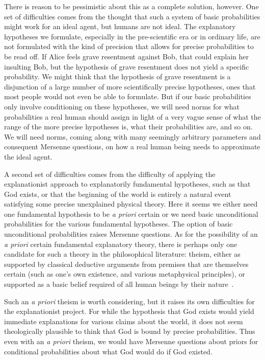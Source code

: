 There is reason to be pessimistic about this as a complete solution, however. One set of difficulties comes
from the thought that such a system of basic probabilities might work for an ideal agent, but humans are not
ideal. The explanatory hypotheses we formulate, especially in the pre-scientific era or in ordinary life, are not formulated
with the kind of precision that allows for precise probabilities to be read off. If Alice feels grave resentment against
Bob, that could explain her insulting Bob, but the hypothesis of grave resentment does not yield a specific 
probability. We might think that the hypothesis of grave resentment is a disjunction of a large
number of more scientifically precise hypotheses, ones that most people would not even be able to formulate. 
But if our basic probabilities only involve conditioning on these hypotheses, we will need norms for what probabilities 
a real human should assign in light of a very vague sense of what the range of the more precise hypotheses is,
what their probabilities are, and so on. We will need norms, coming along with many seemingly arbitrary parameters
and consequent Mersenne questions, on how a real human being needs to approximate the ideal agent.

A second set of difficulties comes from the difficulty of applying the explanationist approach to explanatorily 
fundamental hypotheses, such as that God exists, or that the beginning of the world is entirely a natural event 
satisfying some precise unexplained physical theory. Here it seems we either need one fundamental hypothesis to be 
\textit{a priori} certain or we need basic unconditional probabilities for the various fundamental hypotheses. 
The option of basic unconditional probabilities raises Mersenne questions. As for the possibility of 
an \textit{a priori} certain fundamental explanatory theory, there is perhaps only one candidate for such a 
theory in the philosophical literature: theism, either as supported by classical deductive arguments from
premises that are themselves certain (such as one's own existence, and various metaphysical principles), or 
supported as a basic belief required of all human beings by their nature~.

Such an \textit{a 
priori} theism is worth considering, but it raises its own difficulties for the explanationist project. For 
while the hypothesis that God exists would yield immediate explanations for various claims about the world,
it does not seem theologically plausible to think that God is bound by precise probabilities. Thus even with 
an \textit{a priori} theism, we would have Mersenne questions about priors for conditional probabilities about
what God would do if God existed.

